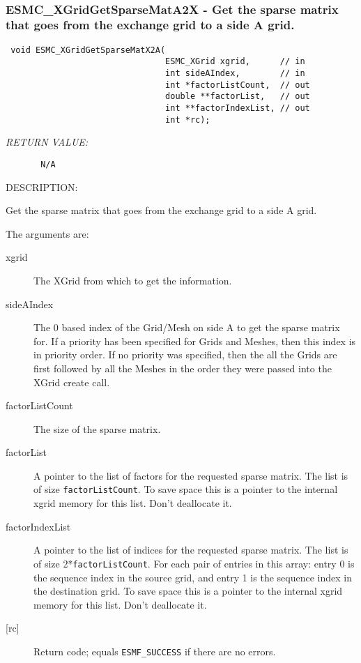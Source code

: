  
\mbox{}\hrulefill\ 
 
\subsubsection [ESMC\_XGridGetSparseMatA2X] {ESMC\_XGridGetSparseMatA2X - Get the sparse matrix that goes from the exchange grid to a side A grid.}


 
  
\begin{verbatim} void ESMC_XGridGetSparseMatX2A(
                                ESMC_XGrid xgrid,      // in
                                int sideAIndex,        // in
                                int *factorListCount,  // out
                                double **factorList,   // out
                                int **factorIndexList, // out
                                int *rc);
 \end{verbatim}{\em RETURN VALUE:}
\begin{verbatim}       N/A\end{verbatim}
{\sf DESCRIPTION:\\ }


   
      Get the sparse matrix that goes from the exchange grid to a side A grid. 
  
    The arguments are:
    \begin{description}
    \item[xgrid]
      The XGrid from which to get the information.
    \item[sideAIndex]
      The 0 based index of the Grid/Mesh on side A to get the sparse matrix for.
      If a priority has been specified for Grids and Meshes, then this index is 
      in priority order. If no priority was specified, then the all the Grids are
      first followed by all the Meshes in the order they were passed into the XGrid 
      create call. 
    \item[factorListCount]
      The size of the sparse matrix.
    \item[factorList]
      A pointer to the list of factors for the requested sparse matrix. 
      The list is of size {\tt factorListCount}. To save space
      this is a pointer to the internal xgrid memory for this list. 
      Don't deallocate it. 
    \item[factorIndexList]
      A pointer to the list of indices for the requested sparse matrix. 
      The list is of size 2*{\tt factorListCount}. For each pair of entries
      in this array: entry 0 is the sequence index in the source grid, and entry 1 is
      the sequence index in the destination grid. To save space 
      this is a pointer to the internal xgrid memory for this list. 
      Don't deallocate it. 
    \item[{[rc]}]
      Return code; equals {\tt ESMF\_SUCCESS} if there are no errors.
    \end{description}
   
